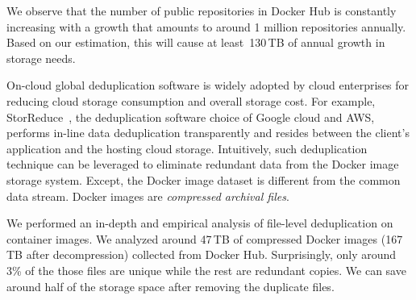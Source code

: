 We observe that the number of public repositories in Docker Hub is constantly increasing with a growth that amounts 
to around 1 million repositories annually. Based on our estimation, this will cause at least~130\,TB of annual growth in storage needs.

On-cloud global deduplication software is widely adopted by cloud enterprises for reducing cloud storage consumption and overall storage cost. 
For example, StorReduce~\cite{StorReduce}, the deduplication software choice of Google cloud and AWS, 
performs in-line data deduplication transparently and resides between the client's application and the hosting cloud storage.
Intuitively, such deduplication technique can be leveraged to eliminate redundant data from the Docker image storage system.  
Except, the Docker image dataset is different from the common data stream. 
Docker images are \emph{compressed archival files}.

We performed an in-depth and empirical analysis of file-level deduplication on container images. 
We analyzed around 47\,TB of compressed Docker images (167\,TB after decompression) collected from Docker Hub. 
Surprisingly, only around 3\% of the those files are unique while the rest are redundant copies. 
We can save around half of the storage space after removing the duplicate files.

